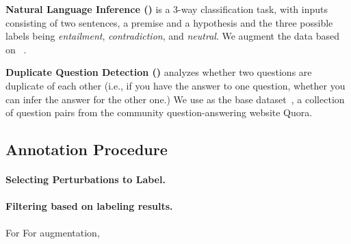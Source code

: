 \textbf{Natural Language Inference (\nli)} is a 3-way classification task, with inputs consisting of two sentences, a premise and a hypothesis and the three possible labels being \emph{entailment}, \emph{contradiction}, and \emph{neutral}.
 We augment the data based on \dnli~\cite{bowman-etal-2015-large}. 
 
\textbf{Duplicate Question Detection (\qqp)} analyzes whether two questions are duplicate of each other (i.e., if you have the answer to one question, whether you can infer the answer for the other one.) 
We use \dqqp as the base dataset~\cite{wang2018glue}, a collection of question pairs from the community question-answering website Quora.



\subsection{Annotation Procedure}



\paragraph{Selecting Perturbations to Label.}


\paragraph{Filtering based on labeling results.}
For 
For augmentation, 



